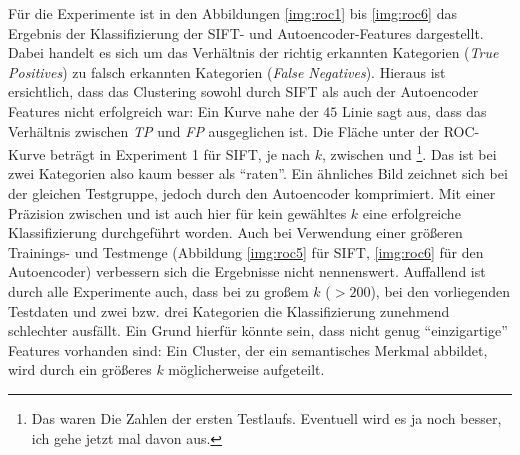 

Für die Experimente ist in den Abbildungen \ref{img:roc1} bis \ref{img:roc6} das Ergebnis der Klassifizierung der SIFT- und Autoencoder-Features dargestellt. Dabei handelt es sich um das Verhältnis der richtig erkannten Kategorien (\textit{True Positives}) zu falsch erkannten Kategorien (\textit{False Negatives}). Hieraus ist ersichtlich, dass das Clustering sowohl durch SIFT als auch der Autoencoder Features nicht erfolgreich war: Ein Kurve nahe der $45${\degree} Linie sagt aus, dass das Verhältnis zwischen \textit{TP} und \textit{FP} ausgeglichen ist. Die Fläche unter der ROC-Kurve beträgt in Experiment 1 für SIFT, je nach $k$, zwischen  und \footnote{Das waren Die Zahlen der ersten Testlaufs. Eventuell wird es ja noch besser, ich gehe jetzt mal davon aus.}. Das ist bei zwei Kategorien also kaum besser als \enquote{raten}. Ein ähnliches Bild zeichnet sich bei der gleichen Testgruppe, jedoch durch den Autoencoder komprimiert. Mit einer Präzision zwischen  und  ist auch hier für kein gewähltes $k$ eine erfolgreiche Klassifizierung durchgeführt worden.\newline
Auch bei Verwendung einer größeren Trainings- und Testmenge (Abbildung \ref{img:roc5} für SIFT, \ref{img:roc6} für den Autoencoder) verbessern sich die Ergebnisse nicht nennenswert. 
Auffallend ist durch alle Experimente auch, dass bei zu großem $k$ ($> 200$), bei den vorliegenden Testdaten und zwei bzw. drei Kategorien die Klassifizierung zunehmend schlechter ausfällt. Ein Grund hierfür könnte sein, dass nicht genug \enquote{einzigartige} Features vorhanden sind: Ein Cluster, der ein semantisches Merkmal abbildet, wird durch ein größeres $k$ möglicherweise aufgeteilt.

